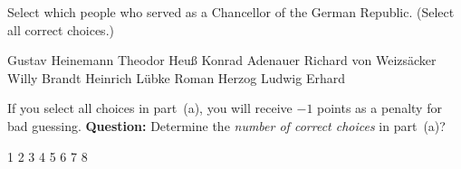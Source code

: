 \documentclass{article}
\begin{document}
\begin{quiz*}{\currQuiz}
\begin{questions}
\begin{questions}
\rowsep{3pt}

        \item{} Select which people who served as a Chancellor of the
            German Republic. (Select all correct choices.)
        \begin{manswers}{2}%
            \bChoices[2]
                 Gustav Heinemann\eAns
                 Theodor Heu{\ss}\eAns
                 Konrad Adenauer\eAns
                 Richard von Weizs\"{a}cker\eAns
                 Willy Brandt\eAns
                 Heinrich L\"{u}bke\eAns
                 Roman Herzog\eAns
                 Ludwig Erhard\eAns
            \eChoices
        \end{manswers}

\rowsep{3pt}

      \item{} If you select all choices in part~(a), you will
          receive $-1$ points as a penalty for bad guessing. \textbf{Question:}
          Determine the \emph{number of correct choices} in part~(a)?
          \begin{answers}{4}
          \bChoices
             1\eAns
             2\eAns
             3\eAns
             4\eAns
             5\eAns
             6\eAns
             7\eAns
             8\eAns
          \eChoices
          \end{answers}
    \end{questions}

\end{questions}
\writeProListAux
\end{quiz*}\quad\thQuizTrailer
\end{document}
